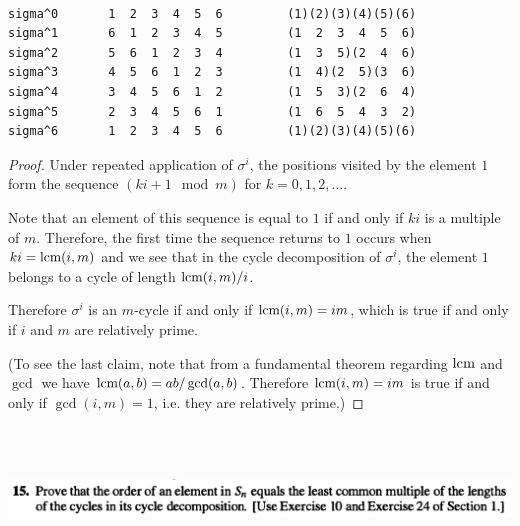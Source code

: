 \begin{example*}
\begin{verbatim}

sigma^0       1  2  3  4  5  6         (1)(2)(3)(4)(5)(6)
sigma^1       6  1  2  3  4  5         (1  2  3  4  5  6)
sigma^2       5  6  1  2  3  4         (1  3  5)(2  4  6)
sigma^3       4  5  6  1  2  3         (1  4)(2  5)(3  6)
sigma^4       3  4  5  6  1  2         (1  5  3)(2  6  4)
sigma^5       2  3  4  5  6  1         (1  6  5  4  3  2)
sigma^6       1  2  3  4  5  6         (1)(2)(3)(4)(5)(6)
\end{verbatim}
\end{example*}

\begin{proof}
  Under repeated application of $\sigma^i$, the positions visited by the element $1$ form the
  sequence $(ki + 1 \mod m)$ for $k=0, 1, 2, \ldots$.

  Note that an element of this sequence is equal to $1$ if and only if $ki$ is a multiple of $m$.
  Therefore, the first time the sequence returns to $1$ occurs when $ki = \text{lcm}(i, m)$ and we see
  that in the cycle decomposition of $\sigma^i$, the element $1$ belongs to a cycle of
  length $\text{lcm}(i, m) / i$.

  Therefore $\sigma^i$ is an $m$-cycle if and only if $\text{lcm}(i, m) = im$, which is true if and only
  if $i$ and $m$ are relatively prime.

  (To see the last claim, note that from a fundamental theorem regarding $\text{lcm}$ and $\gcd$ we
  have $\text{lcm}(a, b) = ab / \gcd(a, b)$. Therefore $\text{lcm}(i, m) = im$ is true if and only
  if $\gcd(i, m) = 1$, i.e. they are relatively prime.)
\end{proof}



~\\~\\
\begin{mdframed}
\includegraphics[width=400pt]{img/algebra--nf--2-3beb.png}
\end{mdframed}

